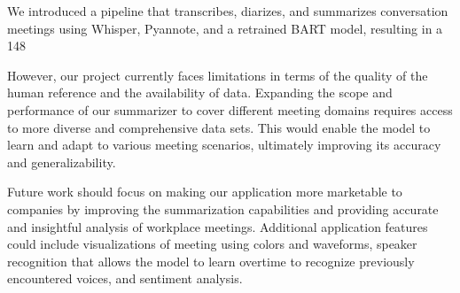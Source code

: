 We introduced a pipeline that transcribes, diarizes, and summarizes conversation meetings using Whisper, Pyannote, and a retrained BART model, resulting in a 148%

However, our project currently faces limitations in terms of the quality of the human reference and the availability of data. Expanding the scope and performance of our summarizer to cover different meeting domains requires access to more diverse and comprehensive data sets. This would enable the model to learn and adapt to various meeting scenarios, ultimately improving its accuracy and generalizability.

Future work should focus on making our application more marketable to companies by improving the summarization capabilities and providing accurate and insightful analysis of workplace meetings.
Additional application features could include visualizations of meeting using colors and waveforms, speaker recognition that allows the model to learn overtime to recognize previously encountered voices, and sentiment analysis.
